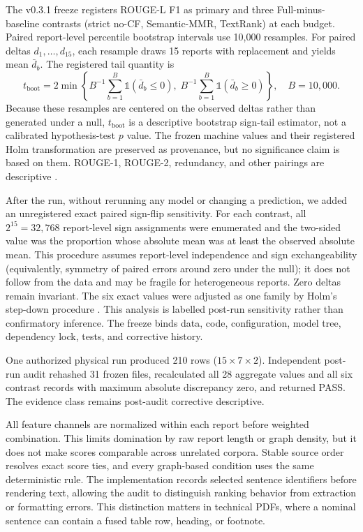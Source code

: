 \documentclass[applsci,article,submit,moreauthors]{Definitions/mdpi}
\begin{document}
The v0.3.1 freeze registers ROUGE-L F1 as primary and three Full-minus-baseline contrasts (strict no-CF, Semantic-MMR, TextRank) at each budget. Paired report-level percentile bootstrap intervals use 10,000 resamples. For paired deltas $d_1,\ldots,d_{15}$, each resample draws 15 reports with replacement and yields mean $\bar d_b$. The registered tail quantity is
\begin{equation}
t_{\mathrm{boot}}=2\min\left\{B^{-1}\sum_{b=1}^{B}\mathbb{1}(\bar d_b\leq0),\;B^{-1}\sum_{b=1}^{B}\mathbb{1}(\bar d_b\geq0)\right\},\quad B=10{,}000.
\end{equation}
Because these resamples are centered on the observed deltas rather than generated under a null, $t_{\mathrm{boot}}$ is a descriptive bootstrap sign-tail estimator, not a calibrated hypothesis-test $p$ value. The frozen machine values and their registered Holm transformation are preserved as provenance, but no significance claim is based on them. ROUGE-1, ROUGE-2, redundancy, and other pairings are descriptive \cite{cameron2008bootstrap}.

After the run, without rerunning any model or changing a prediction, we added an unregistered exact paired sign-flip sensitivity. For each contrast, all $2^{15}=32{,}768$ report-level sign assignments were enumerated and the two-sided value was the proportion whose absolute mean was at least the observed absolute mean. This procedure assumes report-level independence and sign exchangeability (equivalently, symmetry of paired errors around zero under the null); it does not follow from the data and may be fragile for heterogeneous reports. Zero deltas remain invariant. The six exact values were adjusted as one family by Holm's step-down procedure \cite{holm1979simple}. This analysis is labelled post-run sensitivity rather than confirmatory inference. The freeze binds data, code, configuration, model tree, dependency lock, tests, and corrective history.

One authorized physical run produced 210 rows ($15\times7\times2$). Independent post-run audit rehashed 31 frozen files, recalculated all 28 aggregate values and all six contrast records with maximum absolute discrepancy zero, and returned PASS. The evidence class remains post-audit corrective descriptive.

All feature channels are normalized within each report before weighted combination. This limits domination by raw report length or graph density, but it does not make scores comparable across unrelated corpora. Stable source order resolves exact score ties, and every graph-based condition uses the same deterministic rule. The implementation records selected sentence identifiers before rendering text, allowing the audit to distinguish ranking behavior from extraction or formatting errors. This distinction matters in technical PDFs, where a nominal sentence can contain a fused table row, heading, or footnote.
\end{document}
